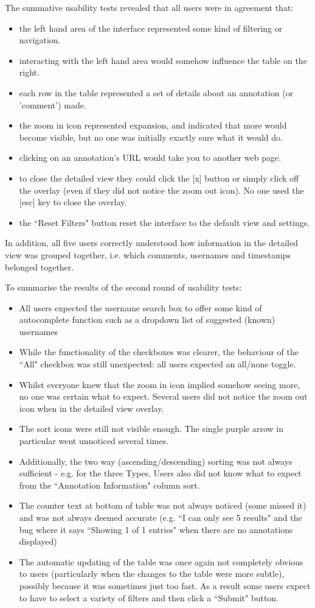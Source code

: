 The summative usability tests revealed that all users were in agreement that:
\begin{itemize}
 \item the left hand area of the interface represented some kind of filtering or navigation.
\item interacting with the left hand area would somehow influence the table on the right.
\item each row in the table represented a set of  details about an annotation (or 'comment') made.
\item the zoom in icon represented expansion, and indicated that more would become visible, but no one was initially exactly sure what it would do.
\item clicking on an annotation's URL would take you to another web page.
\item to close the detailed view they could click the [x] button or simply click off the overlay (even if they did not notice the zoom out icon). No one used the [esc] key to close the overlay. 
\item the ``Reset Filters" button reset the interface to the default view and settings.
\end{itemize}
In addition, all five users correctly understood how information in the detailed view was grouped together, i.e. which comments, usernames and timestamps belonged together. 

To summarise the results of the second round of usability tests:
\begin{itemize}
\item All users expected the username search box to offer some kind of autocomplete function such as a dropdown list of suggested (known) usernames
\item While the functionality of the checkboxes was clearer, the behaviour of the ``All" checkbox was still unexpected: all users expected an all/none toggle. 
\item Whilst everyone knew that the zoom in icon implied somehow seeing more, no one was certain what to expect. Several users did not notice the zoom out icon when in the detailed view overlay.
\item The sort icons were still not visible enough. The single purple arrow in particular went unnoticed several times. \item Additionally, the two way (ascending/descending) sorting was not always sufficient - e.g. for the three Types. Users also did not know what to expect from the ``Annotation Information" column sort.
\item The counter text at bottom of table was not always noticed (some missed it) and was not always deemed accurate (e.g. ``I can only see 5 results" and the bug where it says ``Showing 1 of 1 entries" when there are no annotations displayed)
\item The automatic updating of the table was once again not completely obvious to users (particularly when the changes to the table were more subtle), possibly because it was sometimes just too fast. As a result some users expect to have to select a variety of filters and then click a ``Submit" button. 
\end{itemize}

